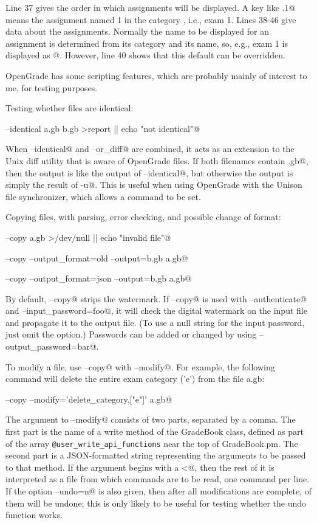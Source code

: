 \documentclass{opengrade_doc}
\begin{document}
Line 37 gives the order in which assignments will be displayed. A key like
\verb@e.1@ means the assignment named 1 in the category \verb@e@, i.e., exam 1.
Lines 38-46 give data about the assignments. Normally the name to be displayed
for an assignment is determined from its category and its name, so, e.g., exam
1 is displayed as @. However, line 40 shows that this default can
be overridden.

\label{scripting}

OpenGrade has some scripting features, which are probably mainly of interest to
me, for testing purposes.

Testing whether files are identical:

\verb@opengrade --identical a.gb b.gb >report || echo "not identical"@

When \verb@--identical@ and \verb@--or_diff@ are combined, it acts as
an extension to the Unix diff utility that is aware of OpenGrade files.
If both filenames contain \verb@.gb@, then the output is like the output of
\verb@--identical@, but otherwise the output is simply the result of
\verb@diff -u@. This is useful when using OpenGrade with the Unison file
synchronizer, which allows a \verb@diff@ command to be set.

Copying files, with parsing, error checking, and possible change of format:

\verb@opengrade --copy a.gb >/dev/null || echo "invalid file"@

\verb@opengrade --copy --output_format=old --output=b.gb a.gb@

\verb@opengrade --copy --output_format=json --output=b.gb a.gb@

By default, \verb@--copy@ strips the watermark.
If \verb@--copy@ is used with \verb@--authenticate@ and
\verb@--input_password=foo@, it will check the digital watermark on the input file
and propagate it to the output file.
(To use a null string for the input password, just omit the
option.)
Passwords can be added or changed by using \verb@--output_password=bar@.

To modify a file, use \verb@--copy@ with \verb@--modify@. For example,
the following command will delete the entire exam category ('e') from
the file a.gb:

\verb@opengrade --copy --modify='delete_category,["e"]' a.gb@

The argument to \verb@--modify@ consists of two parts, separated by a comma.
The first part is the name of a write method of the GradeBook class, defined
as part of the array \verb+@user_write_api_functions+ near the top of
GradeBook.pm. The second part is a JSON-formatted string representing
the arguments to be passed to that method. If the argument begins with a \verb@<@,
then the rest of it is interpreted as a file from which commands are to be read,
one command per line. If the option \verb@--undo=n@ is also given, then after
all modifications are complete, \verb@n@ of them will be undone; this is only
likely to be useful for testing whether the undo function works.
\end{document}
